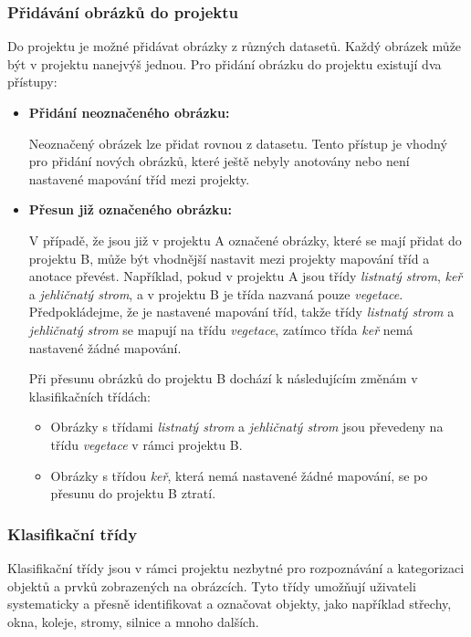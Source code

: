 \subsubsection{Přidávání obrázků do projektu}
Do projektu je možné přidávat obrázky z různých datasetů. Každý obrázek může být v projektu nanejvýš jednou. Pro přidání obrázku do projektu existují dva přístupy:

\begin{itemize}
\item \textbf{Přidání neoznačeného obrázku:} 

Neoznačený obrázek lze přidat rovnou z datasetu. Tento přístup je vhodný pro přidání nových obrázků, které ještě nebyly anotovány nebo není nastavené mapování tříd mezi projekty.

\item \textbf{Přesun již označeného obrázku:}

V případě, že jsou již v projektu A označené obrázky, které se mají přidat do projektu B, může být vhodnější nastavit mezi projekty mapování tříd a anotace převést. Například, pokud v projektu A jsou třídy \textit{listnatý strom}, \textit{keř} a \textit{jehličnatý strom}, a v projektu B je třída nazvaná pouze \textit{vegetace}. Předpokládejme, že je nastavené mapování tříd, takže třídy \textit{listnatý strom} a \textit{jehličnatý strom} se mapují na třídu \textit{vegetace}, zatímco třída \textit{keř} nemá nastavené žádné mapování.

Při přesunu obrázků do projektu B dochází k následujícím změnám v klasifikačních třídách:

\begin{itemize}
\item Obrázky s třídami \textit{listnatý strom} a \textit{jehličnatý strom} jsou převedeny na třídu \textit{vegetace} v rámci projektu B.
\item Obrázky s třídou \textit{keř}, která nemá nastavené žádné mapování, se po přesunu do projektu B ztratí.
\end{itemize}

\end{itemize}

\subsubsection{Klasifikační třídy}

Klasifikační třídy jsou v rámci projektu nezbytné pro rozpoznávání a kategorizaci objektů a prvků zobrazených na obrázcích. Tyto třídy umožňují uživateli systematicky a přesně identifikovat a označovat objekty, jako například střechy, okna, koleje, stromy, silnice a mnoho dalších. 

